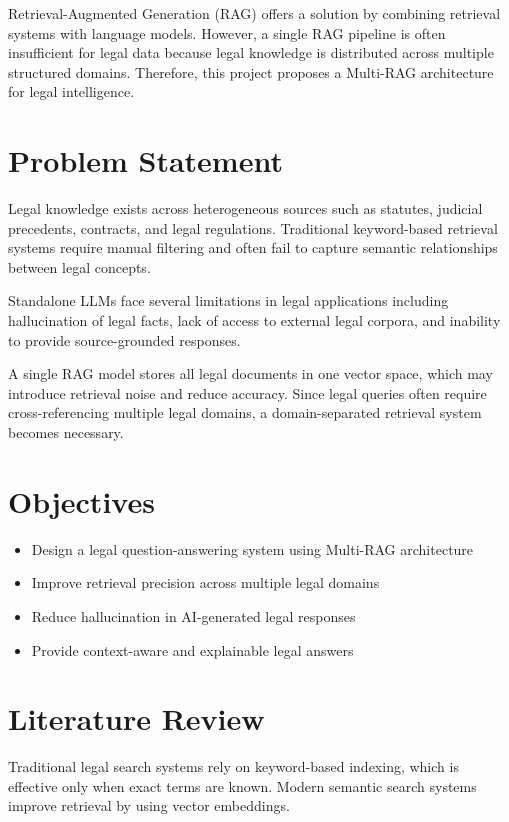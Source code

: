\documentclass[12pt,a4paper]{article}
\begin{document}
Retrieval-Augmented Generation (RAG) offers a solution by combining retrieval systems with language models. However, a single RAG pipeline is often insufficient for legal data because legal knowledge is distributed across multiple structured domains. Therefore, this project proposes a Multi-RAG architecture for legal intelligence.

\section{Problem Statement}

Legal knowledge exists across heterogeneous sources such as statutes, judicial precedents, contracts, and legal regulations. Traditional keyword-based retrieval systems require manual filtering and often fail to capture semantic relationships between legal concepts.

Standalone LLMs face several limitations in legal applications including hallucination of legal facts, lack of access to external legal corpora, and inability to provide source-grounded responses.

A single RAG model stores all legal documents in one vector space, which may introduce retrieval noise and reduce accuracy. Since legal queries often require cross-referencing multiple legal domains, a domain-separated retrieval system becomes necessary.

\section{Objectives}

\begin{itemize}
\item Design a legal question-answering system using Multi-RAG architecture
\item Improve retrieval precision across multiple legal domains
\item Reduce hallucination in AI-generated legal responses
\item Provide context-aware and explainable legal answers
\end{itemize}

\section{Literature Review}

Traditional legal search systems rely on keyword-based indexing, which is effective only when exact terms are known. Modern semantic search systems improve retrieval by using vector embeddings.
\end{document}
